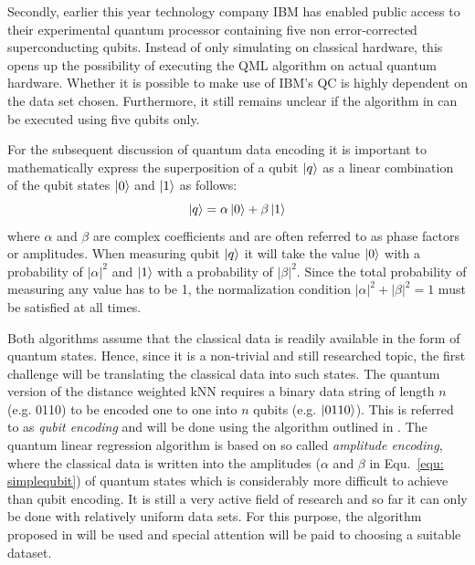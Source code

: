 \documentclass[a4paper]{article}
\newcommand*{\0}{$\ket{0}$}
\newcommand*{\1}{$\ket{1}$}
\begin{document}
Secondly, earlier this year technology company IBM has enabled public access to their experimental quantum processor containing five non error-corrected superconducting qubits. Instead of only simulating on classical hardware, this opens up the possibility of executing the QML algorithm on actual quantum hardware. Whether it is possible to make use of IBM's QC is highly dependent on the data set chosen. Furthermore, it still remains unclear if the algorithm in \cite{Schuld2016} can be executed using five qubits only.

For the subsequent discussion of quantum data encoding it is important to mathematically express the superposition of a qubit $\ket{q}$ as a linear combination of the qubit states \0 and \1 as follows:
\begin{equation}
\label{equ: simplequbit}
\ket{q} = \alpha \ket{0} + \beta \ket{1}
\end{equation}
where $\alpha$ and $\beta$ are complex coefficients and are often referred to as phase factors or amplitudes. When measuring qubit $\ket{q}$ it will take the value \0 with a probability of ${|\alpha|}^{2}$ and \1 with a probability of ${|\beta|}^{2}$. Since the total probability of measuring any value has to be 1, the normalization condition ${|\alpha|}^{2} + {|\beta|}^{2} =  1$ must be satisfied at all times.

Both algorithms assume that the classical data is readily available in the form of quantum states. Hence, since it is a non-trivial and still researched topic, the first challenge will be translating the classical data into such states. The quantum version of the distance weighted kNN requires a binary data string of length $n$ (e.g. 0110) to be encoded one to one into $n$ qubits (e.g. $\ket{0110}$). This is referred to as \textit{qubit encoding} and will be done using the algorithm outlined in \cite{ventura1999initializing}.
The quantum linear regression algorithm is based on so called \textit{amplitude encoding}, where the classical data is written into the amplitudes ($\alpha$ and $\beta$ in Equ.~\ref{equ: simplequbit}) of quantum states which is considerably more difficult to achieve than qubit encoding. It is still a very active field of research and so far it can only be done with relatively uniform data sets. For this purpose, the algorithm proposed in \cite{grover2002creating} will be used and special attention will be paid to choosing a suitable dataset.
\end{document}
